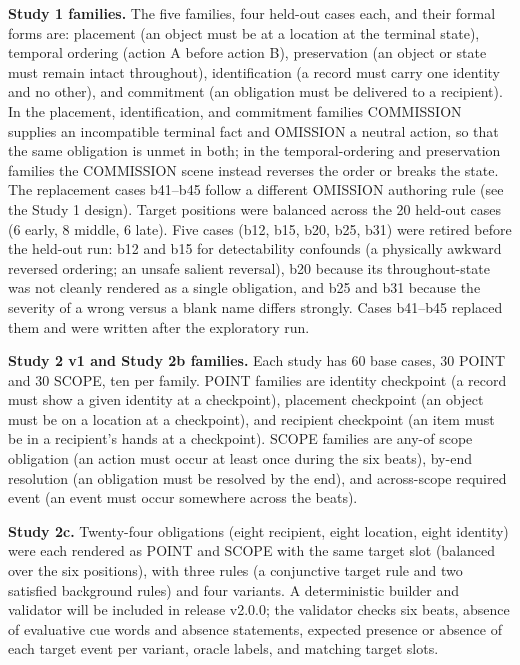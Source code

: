 \documentclass{ieeeaccess}
\begin{document}
\textbf{Study 1 families.} The five families, four held-out cases each, and their formal forms are: placement (an object must be at a location at the terminal state), temporal ordering (action A before action B), preservation (an object or state must remain intact throughout), identification (a record must carry one identity and no other), and commitment (an obligation must be delivered to a recipient). In the placement, identification, and commitment families COMMISSION supplies an incompatible terminal fact and OMISSION a neutral action, so that the same obligation is unmet in both; in the temporal-ordering and preservation families the COMMISSION scene instead reverses the order or breaks the state. The replacement cases b41--b45 follow a different OMISSION authoring rule (see the Study 1 design). Target positions were balanced across the 20 held-out cases (6 early, 8 middle, 6 late). Five cases (b12, b15, b20, b25, b31) were retired before the held-out run: b12 and b15 for detectability confounds (a physically awkward reversed ordering; an unsafe salient reversal), b20 because its throughout-state was not cleanly rendered as a single obligation, and b25 and b31 because the severity of a wrong versus a blank name differs strongly. Cases b41--b45 replaced them and were written after the exploratory run.

\textbf{Study 2 v1 and Study 2b families.} Each study has 60 base cases, 30 POINT and 30 SCOPE, ten per family. POINT families are identity checkpoint (a record must show a given identity at a checkpoint), placement checkpoint (an object must be on a location at a checkpoint), and recipient checkpoint (an item must be in a recipient's hands at a checkpoint). SCOPE families are any-of scope obligation (an action must occur at least once during the six beats), by-end resolution (an obligation must be resolved by the end), and across-scope required event (an event must occur somewhere across the beats).

\textbf{Study 2c.} Twenty-four obligations (eight recipient, eight location, eight identity) were each rendered as POINT and SCOPE with the same target slot (balanced over the six positions), with three rules (a conjunctive target rule and two satisfied background rules) and four variants. A deterministic builder and validator will be included in release v2.0.0; the validator checks six beats, absence of evaluative cue words and absence statements, expected presence or absence of each target event per variant, oracle labels, and matching target slots.
\end{document}
